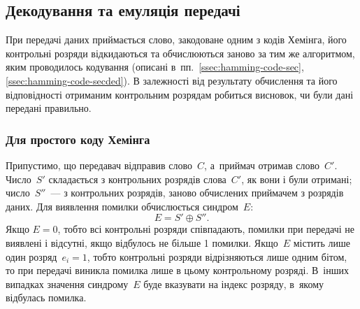 \documentclass[
	a4paper,
	oneside,
	BCOR = 10mm,
	DIV = 12,
	12pt,
	headings = normal,
]{scrartcl}
\begin{document}
		\subsection{Декодування та емуляція передачі}
			При передачі даних приймається слово, закодоване одним з кодів Хемінга, його контрольні розряди відкидаються та обчислюються заново за тим же алгоритмом, яким проводилось кодування (описані в~пп.~\ref{ssec:hamming-code-sec}, \ref{ssec:hamming-code-secded}). В залежності від результату обчислення та його відповідності отриманим контрольним розрядам робиться висновок, чи були дані передані правильно.
			
			\subsubsection{Для простого коду Хемінга}
			\label{sssec:hamming-code-decode-sec}
				Припустимо, що передавач відправив слово~$C$, а~приймач отримав слово~$C'$. Число~$S'$ складається з контрольних розрядів слова~$C'$, як вони і були отримані; число~$S''$~— з контрольних розрядів, заново обчислених приймачем з розрядів даних. Для виявлення помилки обчислюється синдром~$E$:
				\[
					E = S' \oplus S''.
				\]
				Якщо $E = 0$, тобто всі контрольні розряди співпадають, помилки при передачі не виявлені і відсутні, якщо відбулось не більше 1 помилки. Якщо~$E$ містить лише один розряд~$e_i = 1$, тобто контрольні розряди відрізняються лише одним бітом, то при передачі виникла помилка лише в цьому контрольному розряді. В~інших випадках значення синдрому~$E$ буде вказувати на індекс розряду, в~якому відбулась помилка.
\end{document}
